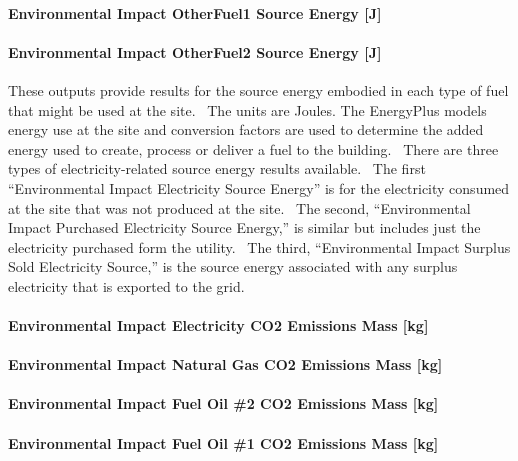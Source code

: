 \paragraph{Environmental Impact OtherFuel1 Source Energy {[}J{]}}\label{environmental-impact-otherfuel1-source-energy-j}

\paragraph{Environmental Impact OtherFuel2 Source Energy {[}J{]}}\label{environmental-impact-otherfuel2-source-energy-j}

These outputs provide results for the source energy embodied in each type of fuel that might be used at the site.~ The units are Joules. The EnergyPlus models energy use at the site and conversion factors are used to determine the added energy used to create, process or deliver a fuel to the building.~ There are three types of electricity-related source energy results available.~ The first ``Environmental Impact Electricity Source Energy'' is for the electricity consumed at the site that was not produced at the site.~ The second, ``Environmental Impact Purchased Electricity Source Energy,'' is similar but includes just the electricity purchased form the utility.~ The third, ``Environmental Impact Surplus Sold Electricity Source,'' is the source energy associated with any surplus electricity that is exported to the grid.

\paragraph{Environmental Impact Electricity CO2 Emissions Mass {[}kg{]}}\label{environmental-impact-electricity-co2-emissions-mass-kg}

\paragraph{Environmental Impact Natural Gas CO2 Emissions Mass {[}kg{]}}\label{environmental-impact-natural-gas-co2-emissions-mass-kg}

\paragraph{Environmental Impact Fuel Oil \#2 CO2 Emissions Mass {[}kg{]}}\label{environmental-impact-fuel-oil-2-co2-emissions-mass-kg}

\paragraph{Environmental Impact Fuel Oil \#1 CO2 Emissions Mass {[}kg{]}}\label{environmental-impact-fuel-oil-1-co2-emissions-mass-kg}

